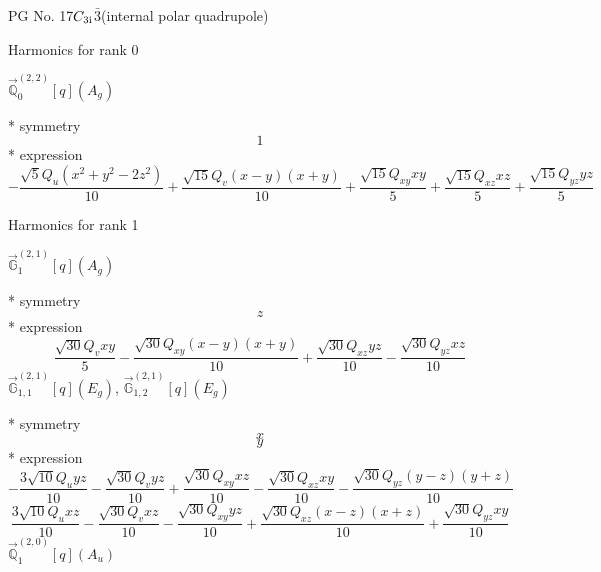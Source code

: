 \documentclass[fleqn,8pt]{jsarticle}
\begin{document}
\setcounter{MaxMatrixCols}{32}

\renewcommand{\tablename}{Table~}
\renewcommand{\figurename}{Figure~}
\begin{center}
\LARGE
PG No. 17\quad$C_{\rm 3i}$\quad$\bar{3}$\quad[ trigonal ] (internal polar quadrupole)
\end{center}

\noindent * Harmonics for rank 0

\noindent\quad $\vec{\mathbb{Q}}_{0}^{(2,2)}[q](A_{g})$

\noindent\quad ** symmetry
\begin{dmath*}
1
\end{dmath*}
\noindent\quad ** expression
\begin{dmath*}
- \frac{\sqrt{5} Q_{u} \left(x^{2} + y^{2} - 2 z^{2}\right)}{10} + \frac{\sqrt{15} Q_{v} \left(x - y\right) \left(x + y\right)}{10} + \frac{\sqrt{15} Q_{xy} x y}{5} + \frac{\sqrt{15} Q_{xz} x z}{5} + \frac{\sqrt{15} Q_{yz} y z}{5}
\end{dmath*}

\noindent * Harmonics for rank 1

\noindent\quad $\vec{\mathbb{G}}_{1}^{(2,1)}[q](A_{g})$

\noindent\quad ** symmetry
\begin{dmath*}
z
\end{dmath*}
\noindent\quad ** expression
\begin{dmath*}
\frac{\sqrt{30} Q_{v} x y}{5} - \frac{\sqrt{30} Q_{xy} \left(x - y\right) \left(x + y\right)}{10} + \frac{\sqrt{30} Q_{xz} y z}{10} - \frac{\sqrt{30} Q_{yz} x z}{10}
\end{dmath*}
\noindent\quad $\vec{\mathbb{G}}_{1,1}^{(2,1)}[q](E_{g})$, $\vec{\mathbb{G}}_{1,2}^{(2,1)}[q](E_{g})$

\noindent\quad ** symmetry
\begin{dmath*}
x
\end{dmath*}
\begin{dmath*}
y
\end{dmath*}
\noindent\quad ** expression
\begin{dmath*}
- \frac{3 \sqrt{10} Q_{u} y z}{10} - \frac{\sqrt{30} Q_{v} y z}{10} + \frac{\sqrt{30} Q_{xy} x z}{10} - \frac{\sqrt{30} Q_{xz} x y}{10} - \frac{\sqrt{30} Q_{yz} \left(y - z\right) \left(y + z\right)}{10}
\end{dmath*}
\begin{dmath*}
\frac{3 \sqrt{10} Q_{u} x z}{10} - \frac{\sqrt{30} Q_{v} x z}{10} - \frac{\sqrt{30} Q_{xy} y z}{10} + \frac{\sqrt{30} Q_{xz} \left(x - z\right) \left(x + z\right)}{10} + \frac{\sqrt{30} Q_{yz} x y}{10}
\end{dmath*}
\noindent\quad $\vec{\mathbb{Q}}_{1}^{(2,0)}[q](A_{u})$
\end{document}
